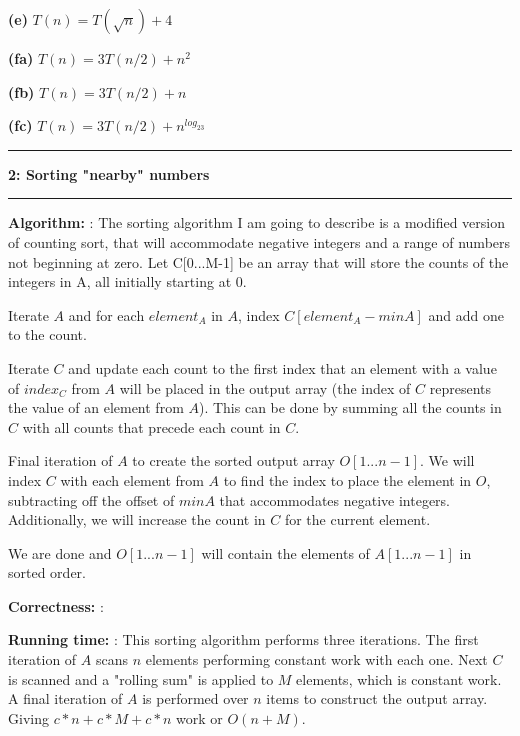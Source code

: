 \documentclass[11pt]{article}
\newcommand\question[2]{\vspace{.25in}\hrule\textbf{#1: #2}\vspace{.5em}\hrule\vspace{.10in}}
\renewcommand\part[1]{\vspace{.10in}\textbf{(#1)}}
\newcommand\algorith{\vspace{.10in}\textbf{Algorithm: }}
\newcommand\correctness{\vspace{.10in}\textbf{Correctness: }}
\newcommand\runtime{\vspace{.10in}\textbf{Running time: }}
\begin{document}
\part{e} $T(n) = T(\sqrt{n}) + 4$

\part{fa} $T(n) = 3T(n/2) + n^2$

\part{fb} $T(n) = 3T(n/2) + n$

\part{fc} $T(n) = 3T(n/2) + n^{log_23}$

\question{2}{Sorting "nearby" numbers} 

\algorith: The sorting algorithm I am going to describe is a modified version of counting sort, that will accommodate negative integers and a range of numbers not beginning at zero. Let C[0...M-1] be an array that will store the counts of the integers in A, all initially starting at 0. 

Iterate $A$ and for each $element_A$ in $A$, index $C[element_A - minA]$ and add one to the count. 

Iterate $C$ and update each count to the first index that an element with a value of $index_C$ from $A$ will be placed in the output array (the index of $C$ represents the value of an element from $A$). This can be done by summing all the counts in $C$ with all counts that precede each count in $C$.

Final iteration of $A$ to create the sorted output array $O[1...n-1]$. We will index $C$ with each element from $A$ to find the index to place the element in $O$, subtracting off the offset of $minA$ that accommodates negative integers. Additionally, we will increase the count in $C$ for the current element. 

We are done and $O[1...n-1]$ will contain the elements of $A[1...n-1]$ in sorted order.

\correctness: 

\runtime: This sorting algorithm performs three iterations. The first iteration  of $A$ scans $n$ elements performing constant work with each one. Next $C$ is scanned and a "rolling sum" is applied to $M$ elements, which is constant work. A final iteration of $A$ is performed over $n$ items to construct the output array. Giving $c*n + c*M + c*n$ work or $O(n + M)$.
\end{document}
